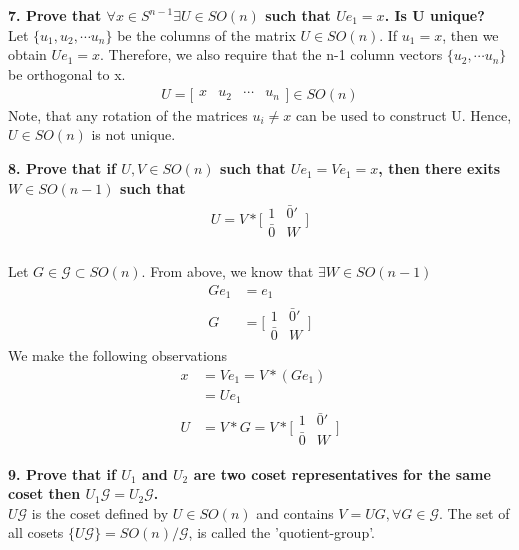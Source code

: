 \documentclass[11pt]{article}
\begin{document}
\hrulefill

\textbf{7. Prove that $\forall x \in S^{n-1} \exists U \in SO(n)$ such that $Ue_1 = x$. Is U unique? }\\
Let $\{u_1, u_2, \cdots u_n\}$ be the columns of the matrix $U \in SO(n)$. If $u_1 = x$, then we obtain $Ue_1 = x$. Therefore, we also require that the n-1 column vectors $\{u_2,\cdots u_n\}$ be orthogonal to x.
\begin{align*}
U = \bigg[\begin{array}{cccc}
x &u_2 &\cdots &u_n
\end{array}\bigg] \in SO(n)
\end{align*}
Note, that any rotation of the matrices $u_{i} \neq x$ can be used to construct U. Hence, $U \in SO(n)$ is not unique.



\hrulefill

\textbf{8. Prove that if $U,V \in SO(n)$ such that $Ue_1 = Ve_1 = x$, then there exits $W \in SO(n-1)$ such that
\begin{align*}
U = V*\bigg[\begin{array}{cc}
1 & \bar{0}'\\
\bar{0} & W
\end{array}\bigg]
\end{align*}
}
\\
Let $G \in \mathcal{G} \subset SO(n)$. From above, we know that $\exists W \in SO(n-1)$
\begin{align*}
Ge_1 &= e_1\\
G &= \bigg[\begin{array}{cc}
1 & \bar{0}'\\
\bar{0} & W
\end{array}\bigg]
\end{align*}
We make the following observations
\begin{align*}
x &= Ve_1 = V*(G e_1)\\
&= U e_1\\
U &= V*G = V*\bigg[\begin{array}{cc}
1 & \bar{0}'\\
\bar{0} & W
\end{array}\bigg]
\end{align*}

\hrulefill

\textbf{9. Prove that if $U_1$ and $U_2$ are two coset representatives for the same coset then $U_1 \mathcal{G} = U_2 \mathcal{G}$.}\\
$U\mathcal{G}$ is the coset defined by $U \in SO(n)$ and contains $V = UG, \forall G\in \mathcal{G}$.
The set of all cosets $\{U\mathcal{G}\} = SO(n)/\mathcal{G}$, is called the 'quotient-group'.
\end{document}
